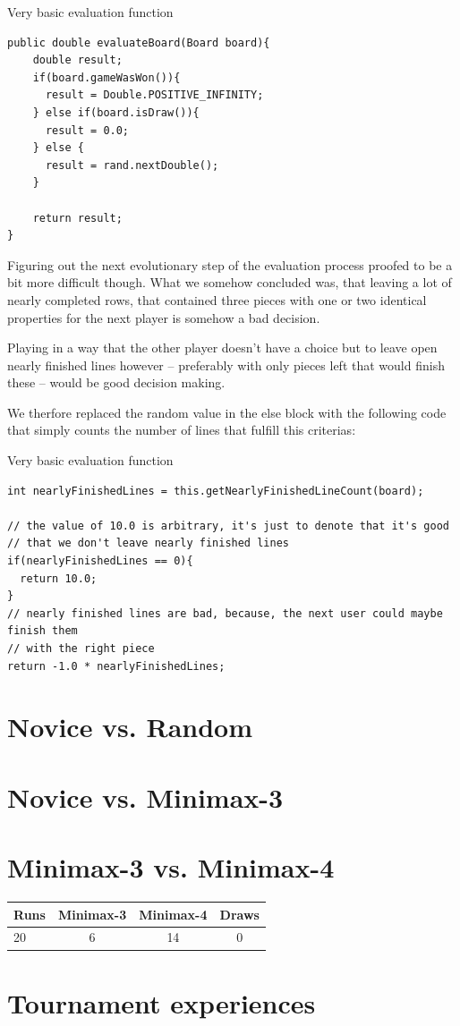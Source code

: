 \documentclass{scrartcl}
\begin{document}
\begin{listing}[H]
\caption{Very basic evaluation function}
\begin{verbatim}
public double evaluateBoard(Board board){
    double result;
    if(board.gameWasWon()){
      result = Double.POSITIVE_INFINITY;
    } else if(board.isDraw()){
      result = 0.0;
    } else {
      result = rand.nextDouble();
    }

    return result;
}
\end{verbatim}
\end{listing}

Figuring out the next evolutionary step of the evaluation process proofed to be a bit more difficult though. What we somehow concluded was, that leaving a lot of nearly completed rows, that contained three pieces with one or two identical properties for the next player is somehow a bad decision.

Playing in a way that the other player doesn't have a choice but to leave open nearly finished lines however -- preferably with only pieces left that would finish these -- would be good decision making.

We therfore replaced the random value in the else block with the following code that simply counts the number of lines that fulfill this criterias:

\begin{listing}[H]
\caption{Very basic evaluation function}
\begin{verbatim}
int nearlyFinishedLines = this.getNearlyFinishedLineCount(board);

// the value of 10.0 is arbitrary, it's just to denote that it's good 
// that we don't leave nearly finished lines
if(nearlyFinishedLines == 0){
  return 10.0;
}
// nearly finished lines are bad, because, the next user could maybe finish them 
// with the right piece
return -1.0 * nearlyFinishedLines;
\end{verbatim}
\end{listing}


\section{Novice vs. Random}

\section{Novice vs. Minimax-3}

\section{Minimax-3 vs. Minimax-4}


\begin{tabular}{l c c c}
Runs & Minimax-3 & Minimax-4 & Draws \\
\hline
20 & 6 & 14 & 0  \\
\end{tabular}


\section{Tournament experiences}
\end{document}
